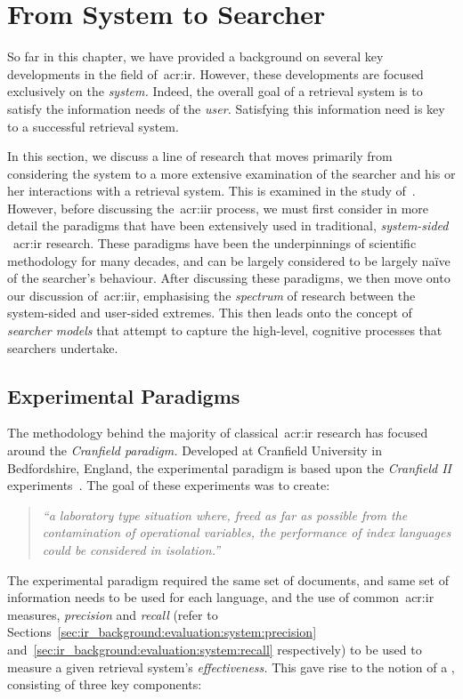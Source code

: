 \section{From System to Searcher}\label{sec:ir_background:user}
So far in this chapter, we have provided a background on several key developments in the field of~\gls{acr:ir}. However, these developments are focused exclusively on the \emph{system.} Indeed, the overall goal of a retrieval system is to satisfy the information needs of the \emph{user.} Satisfying this information need is key to a successful retrieval system.

In this section, we discuss a line of research that moves primarily from considering the system to a more extensive examination of the searcher and his or her interactions with a retrieval system. This is examined in the study of~. However, before discussing the~\gls{acr:iir} process, we must first consider in more detail the paradigms that have been extensively used in traditional, \emph{system-sided} ~\gls{acr:ir} research. These paradigms have been the underpinnings of scientific methodology for many decades, and can be largely considered to be largely na\"{i}ve of the searcher's behaviour. After discussing these paradigms, we then move onto our discussion of~\gls{acr:iir}, emphasising the \emph{spectrum} of research between the system-sided and user-sided extremes. This then leads onto the concept of \emph{searcher models} that attempt to capture the high-level, cognitive processes that searchers undertake.

\subsection{Experimental Paradigms}\label{sec:ir_background:paradigms}
The methodology behind the majority of classical~\gls{acr:ir} research has focused around the \emph{Cranfield paradigm.} Developed at Cranfield University in Bedfordshire, England, the experimental paradigm is based upon the \emph{Cranfield II} experiments~\citep{aslib1966factors}. The goal of these experiments was to create:

\begin{quote}
\emph{``a laboratory type situation where, freed as far as possible from the contamination of operational variables, the performance of index languages could be considered in isolation.''}
\end{quote}

The experimental paradigm required the same set of documents, and same set of information needs to be used for each language, and the use of common~\gls{acr:ir} measures, \emph{precision} and \emph{recall} (refer to Sections~\ref{sec:ir_background:evaluation:system:precision} and~\ref{sec:ir_background:evaluation:system:recall} respectively) to be used to measure a given retrieval system's \emph{effectiveness.} This gave rise to the notion of a , consisting of three key components:

